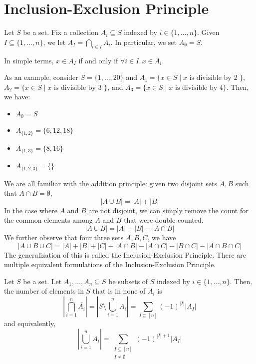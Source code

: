 \section{Inclusion-Exclusion Principle}

\begin{definition} \label{def:inc-exc-notation}
    Let $S$ be a set. Fix a collection $A_i \subseteq S$ indexed by $i \in \{1,\ldots,n\}$. Given $I \subseteq \{1,\ldots,n\}$, we let $A_I = \bigcap_{i\in I} A_i$. In particular, we set $A_{\emptyset} = S$.
\end{definition}

In simple terms, $x \in A_I$ if and only if $\forall i \in I.\, x \in A_i$.

As an example, consider $S = \{1,\ldots,20\}$ and $A_1 = \{ x \in S \mid \text{$x$ is divisible by 2 }\}$, $A_2 = \{ x \in S \mid \text{$x$ is divisible by 3 }\}$, and $A_3 = \{ x \in S \mid \text{$x$ is divisible by 4}\}$. Then, we have:
\begin{itemize}
    \item $A_{\emptyset} = S$
    \item $A_{\{1,2\}} = \{6,12,18\}$
    \item $A_{\{1,3\}} = \{8, 16\}$
    \item $A_{\{1,2,3\}} = \{\}$  
\end{itemize}

We are all familiar with the addition principle: given two disjoint sets $A, B$ such that $A \cap B = \emptyset$,
$$
|A \cup B| = |A| + |B|
$$
In the case where $A$ and $B$ are not disjoint, we can simply remove the count for the common elements among $A$ and $B$ that were double-counted.
$$
|A \cup B| = |A| + |B| - |A \cap B|
$$
We further observe that four three sets $A,B,C$, we have
$$
|A \cup B \cup C| = |A| + |B| + |C| - |A \cap B| - |A \cap C| - |B \cap C| - |A \cap B \cap C|
$$
The generalization of this is called the Inclusion-Exclusion Principle. There are multiple equivalent formulations of the Inclusion-Exclusion Principle.

\begin{theorem}
    Let $S$ be a set. Let $A_1,\ldots,A_n \subseteq S$ be subsets of $S$ indexed by $i \in \{1,\ldots,n\}$. Then, the number of elements in $S$ that is in none of $A_i$ is
    $$
    \left| \bigcap_{i=1}^n \overline{A_i} \right| = \left| S \setminus \bigcup_{i = 1}^n A_i \right| = \sum_{I \subseteq [n]} (-1)^{|I|} |A_I|
    $$
    and equivalently,
    $$
    \left| \bigcup_{i=1}^n A_i \right| = \sum_{\substack{I \subseteq [n] \\ I \neq \emptyset}} (-1)^{|I|+1} |A_I|
    $$
\end{theorem}

